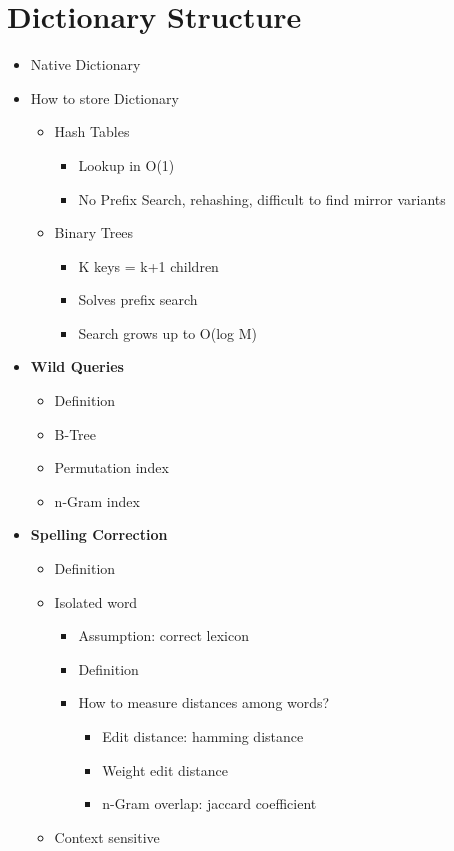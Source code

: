 \chapter{Dictionary Structure}
\begin{itemize}
    \item Native Dictionary
    \item How to store Dictionary
    \begin{itemize}
        \item Hash Tables
        \begin{itemize}
            \item Lookup in O(1)
            \item No Prefix Search, rehashing, difficult to find mirror variants 
        \end{itemize}
        \item Binary Trees
        \begin{itemize}
            \item K keys = k+1 children
            \item Solves prefix search
            \item Search grows up to O(log M)
        \end{itemize}
    \end{itemize}
    \item \textbf{Wild Queries}
    \begin{itemize}
        \item Definition
        \item B-Tree
        \item Permutation index
        \item n-Gram index
    \end{itemize}
    \item \textbf{Spelling Correction}
    \begin{itemize}
        \item Definition
        \item Isolated word
        \begin{itemize}
            \item Assumption: correct lexicon
            \item Definition
            \item How to measure distances among words?
            \begin{itemize}
                \item Edit distance: hamming distance
                \item Weight edit distance
                \item n-Gram overlap: jaccard coefficient
            \end{itemize}
        \end{itemize}
        \item Context sensitive
    \end{itemize}
\end{itemize}


